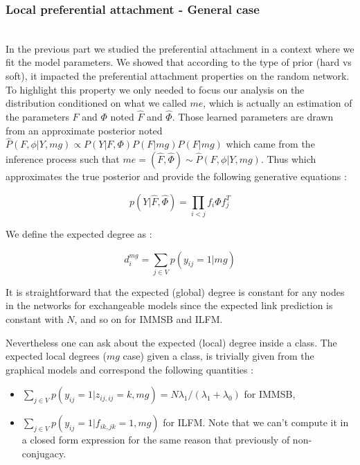 \subsubsection{Local preferential attachment - General case}~\\

In the previous part we studied the preferential attachment in a context where we fit the model parameters. We showed that according to the type of prior (hard vs soft), it impacted the preferential attachment properties on the random network. To highlight this property we only needed to focus our analysis on the distribution conditioned on what we called $me$, which is actually an estimation of the parameters $F$ and $\Phi$ noted $\hat F$ and $\hat \Phi$. Those learned parameters are drawn from an approximate posterior noted $\hat P(F, \phi | Y, mg) \propto P(Y|F, \Phi)P(F|mg)P(F|mg)$ which came from the inference process such that $me = (\hat F, \hat \Phi) \sim \hat P(F, \phi | Y, mg)$. Thus which approximates the true posterior and provide the following generative equations :

\begin{equation}
    p(Y | \hat F, \hat \Phi) = \prod_{i<j} f_i \Phi f_j^T
\end{equation}

We define the expected degree as :

\begin{equation}
d_{i}^{mg} = \sum_{j\in V} p(y_{ij}=1 | mg)
\end{equation}

It is straightforward that the expected (global) degree is constant for any nodes in the networks for exchangeable models since  the expected link prediction is constant with $N$, and so on for IMMSB and ILFM. 

Nevertheless one can ask about the  expected (local) degree inside a class. The expected local degrees ($mg$ case) given a class, is trivially given from the graphical models and correspond the following quantities  :
\begin{itemize}
	\item $\sum_{j\in V} p(y_{ij}=1  | z_{ij, ij}=k, mg) = N \lambda_1 / (\lambda_1 + \lambda_0)$ for IMMSB,
	\item $\sum_{j\in V} p(y_{ij}=1  | f_{ik, jk}=1, mg)$  for ILFM. Note that we can't compute it in a closed form expression for the same reason that previously of non-conjugacy.
\end{itemize}

